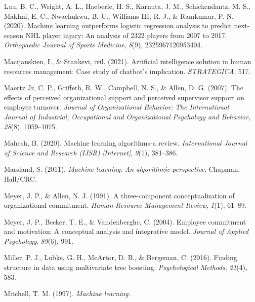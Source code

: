 \documentclass[
  man]{apa7}
\newlength{\cslhangindent}
\newlength{\cslentryspacingunit} %
\newenvironment{CSLReferences}[2] %
 {%
  \setlength{\parindent}{0pt}
  \ifodd #1
  \let\oldpar\par
  \def\par{\hangindent=\cslhangindent\oldpar}
  \fi
  \setlength{\parskip}{#2\cslentryspacingunit}
 }%
 {}
\begin{document}
\begin{CSLReferences}{1}{0}
\leavevmode{}%
Luu, B. C., Wright, A. L., Haeberle, H. S., Karnuta, J. M., Schickendantz, M. S., Makhni, E. C., Nwachukwu, B. U., Williams III, R. J., \& Ramkumar, P. N. (2020). Machine learning outperforms logistic regression analysis to predict next-season NHL player injury: An analysis of 2322 players from 2007 to 2017. \emph{Orthopaedic Journal of Sports Medicine}, \emph{8}(9), 2325967120953404.

\leavevmode{}%
Macijauskien, I., \& Stankevi, ivil. (2021). Artificial intelligence solution in human resources management: Case study of chatbot's implication. \emph{STRATEGICA}, 517.

\leavevmode{}%
Maertz Jr, C. P., Griffeth, R. W., Campbell, N. S., \& Allen, D. G. (2007). The effects of perceived organizational support and perceived supervisor support on employee turnover. \emph{Journal of Organizational Behavior: The International Journal of Industrial, Occupational and Organizational Psychology and Behavior}, \emph{28}(8), 1059--1075.

\leavevmode{}%
Mahesh, B. (2020). Machine learning algorithms-a review. \emph{International Journal of Science and Research (IJSR).{[}Internet{]}}, \emph{9}(1), 381--386.

\leavevmode{}%
Marsland, S. (2011). \emph{Machine learning: An algorithmic perspective}. Chapman; Hall/CRC.

\leavevmode{}%
Meyer, J. P., \& Allen, N. J. (1991). A three-component conceptualization of organizational commitment. \emph{Human Resource Management Review}, \emph{1}(1), 61--89.

\leavevmode{}%
Meyer, J. P., Becker, T. E., \& Vandenberghe, C. (2004). Employee commitment and motivation: A conceptual analysis and integrative model. \emph{Journal of Applied Psychology}, \emph{89}(6), 991.

\leavevmode{}%
Miller, P. J., Lubke, G. H., McArtor, D. B., \& Bergeman, C. (2016). Finding structure in data using multivariate tree boosting. \emph{Psychological Methods}, \emph{21}(4), 583.

\leavevmode{}%
Mitchell, T. M. (1997). \emph{Machine learning}.


\end{CSLReferences}
\end{document}
